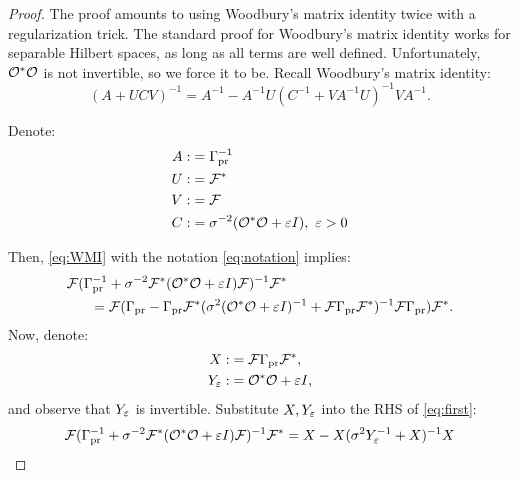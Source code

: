 \begin{proof}
  The proof amounts to using Woodbury's matrix identity twice with a
  regularization trick. The standard proof for Woodbury's matrix
  identity works for separable Hilbert spaces, as long as all terms
  are well defined. Unfortunately, $\mathcal{O}^*\mathcal{O}$ is not invertible, so
  we force it to be. Recall Woodbury's matrix identity:
  \begin{equation}\label{eq:WMI}
    (A + UCV)^{-1} = A^{-1} - A^{-1}U(C^{-1} + VA^{-1}U)^{-1}VA^{-1}. 
  \end{equation}

  Denote:
  \begin{align}\label{eq:notation}
    \begin{split}
      A :&= \prcov^{-1} \\
      U :&= \fwd^* \\
      V :&= \fwd \\
      C :&= \sigma^{-2} (\obs^*\obs+\eps I),\ \eps > 0
    \end{split}
  \end{align}

  Then, \eqref{eq:WMI} with the notation \eqref{eq:notation} implies:
  \begin{align}\label{eq:first}
    \begin{split}
    &\fwd( \prcov^{-1} + \sigma^{-2}  \fwd^* (\obs^* \obs +\eps I) \fwd )^{-1}\fwd^* \\
    &\ \ \ \ \ = \fwd ( \prcov - \prcov \fwd^* ( \sigma^2(\obs^*\obs + \eps I)^{-1} + \fwd \prcov \fwd^* )^{-1} \fwd \prcov ) \fwd^*. \\
    \end{split}
  \end{align}
  Now, denote:
  \begin{align*}
    X :&= \fwd\prcov \fwd^*, \\
    Y_{\eps} :&= \obs^*\obs + \eps I,
  \end{align*}
  and observe that $Y_{\varepsilon}$ is invertible. Substitute $X, Y_{\varepsilon}$
  into the RHS of \eqref{eq:first}:
   \begin{equation}\label{eq:second}
     \fwd( \prcov^{-1} + \sigma^{-2}  \fwd^* (\obs^* \obs +\eps I) \fwd )^{-1}\fwd^* = X - X(\sigma^2Y_{\eps}^{-1} + X)^{-1}X
   \end{equation}


\end{proof}
